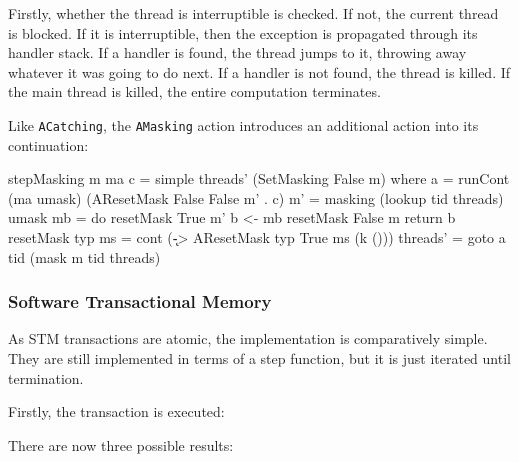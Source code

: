 Firstly, whether the thread is interruptible is checked. If not, the
current thread is blocked. If it is interruptible, then the exception
is propagated through its handler stack. If a handler is found, the
thread jumps to it, throwing away whatever it was going to do next. If
a handler is not found, the thread is killed. If the main thread is
killed, the entire computation terminates.

Like \verb|ACatching|, the \verb|AMasking| action introduces an
additional action into its continuation:

\begin{haskellcode}
stepMasking m ma c = simple threads' (SetMasking False m) where
  a = runCont (ma umask) (AResetMask False False m' . c)
  m' = masking (lookup tid threads)
  umask mb = do
    resetMask True m'
    b <- mb
    resetMask False m
    return b
  resetMask typ ms = cont (\k -> AResetMask typ True ms (k ()))
  threads' = goto a tid (mask m tid threads)
\end{haskellcode}

\subsubsection{Software Transactional Memory}
\label{sec:execution-stepwise-stm}

As STM transactions are atomic, the implementation is comparatively
simple. They are still implemented in terms of a step function, but it
is just iterated until termination.

Firstly, the transaction is executed:


There are now three possible results:

